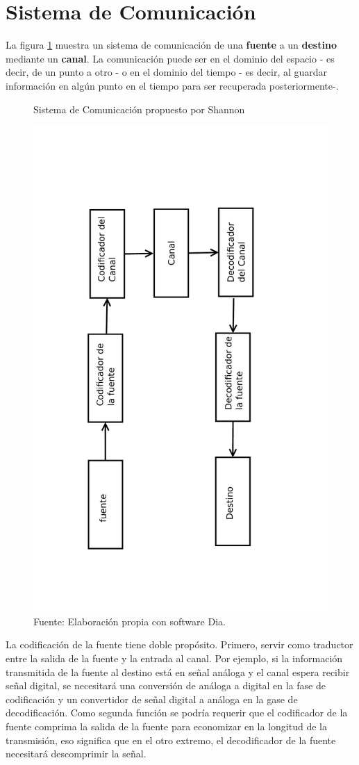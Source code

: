 \section{\quad Sistema de Comunicación}
La figura \ref{fig:sistemaComunicacion} muestra un sistema de comunicación de una \textbf{fuente} a un \textbf{destino} mediante un \textbf{canal}. La comunicación puede ser en el dominio del espacio - es decir, de un punto a otro - o en el dominio del tiempo - es decir, al guardar información en algún punto en el tiempo para ser recuperada posteriormente-.
\begin{figure}
\centering
\caption{Sistema de Comunicación propuesto por Shannon}
\includegraphics[angle=-90,width=0.7\linewidth]{sistema.pdf}
\caption*{Fuente: Elaboración propia con software Dia.}
\label{fig:sistemaComunicacion}
\end{figure}
La codificación de la fuente tiene doble propósito. Primero, servir como traductor entre la salida de la fuente y la entrada al canal. Por ejemplo, si la información transmitida de la fuente al destino está en señal análoga y el canal espera recibir señal digital, se necesitará una conversión de análoga a digital en la fase de codificación y un convertidor de señal digital a análoga en la gase de decodificación. Como segunda función se podría requerir que el codificador de la fuente comprima la salida de la fuente para economizar en la longitud de la transmisión, eso significa que en el otro extremo, el decodificador de la fuente necesitará descomprimir la señal.

